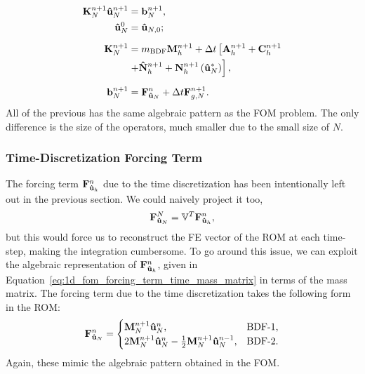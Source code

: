 \documentclass[../../thesis.tex]{subfiles}
\newcommand{\rbV}{\ensuremath{\mathbb{V}}}
\newcommand{\rbVT}{\ensuremath{\rbV^T}}
\newcommand{\dt}{\ensuremath{\Delta t}}
\newcommand{\Ah}[1]{\ensuremath{\vb{#1}^{n+1}_h}}
\begin{document}
\begin{subequations}
    \label{eq:1d_rom_linear_system_timestep}
    \begin{align}
        \vb{K}_{N}^{n+1} \vb{\hat{u}}_{N}^{n+1} &= \vb{b}_{N}^{n+1}, 
        \\
        \vb{\hat{u}}_{N}^{0} &= \vb{\hat{u}}_{N,0};
        \\[2mm]
        \vb{K}_{N}^{n+1} &= m_{\text{BDF}} \Ah{M} + \dt \left[\Ah{A} + \Ah{C} \right. 
        \nonumber 
        \\
                        &\left. + \Ah{\hat{N}} + \Ah{N}\left(\vb{\hat{u}}_{N}^{*}\right)\right],
        \\[2mm]
        \vb{b}_{N}^{n+1} &= \vb{F}_{\vb{\hat{u}}_{N}}^{n} + \dt \vb{F}_{g,N}^{n+1}.
    \end{align}
\end{subequations}
All of the previous has the same algebraic pattern as the FOM problem.
The only difference is the size of the operators, much smaller due to the small size of $N$. 

\subsubsection*{Time-Discretization Forcing Term}
The forcing term $\vb{F}_{\vb{\hat{u}}_h}^{n}$ due to the time discretization has been intentionally left out in the previous section.
We could naively project it too, 
\begin{equation}
    \vb{F}_{\vb{\hat{u}}_N}^{N} = \rbVT \vb{F}_{\vb{\hat{u}}_h}^{n},
\end{equation}
but this would force us to reconstruct the FE vector of the ROM at each time-step, making the integration cumbersome.
To go around this issue, we can exploit the algebraic representation of $\vb{F}_{\vb{\hat{u}}_h}^{n}$, 
given in Equation~\eqref{eq:1d_fom_forcing_term_time_mass_matrix} in terms of the mass matrix. 
The forcing term due to the time discretization takes the following form in the ROM:
\begin{equation}
    \vb{F}_{\vb{\hat{u}}_N}^{n} = 
    \begin{cases}
        \vb{M}_{N}^{n+1} \vb{\hat{u}}_{N}^{n},                & \text{BDF-1},
        \\
        2 \vb{M}_{N}^{n+1} \vb{\hat{u}}_{N}^{n}
        - \frac{1}{2}\vb{M}_{N}^{n+1} \vb{\hat{u}}_{N}^{n-1}, & \text{BDF-2}.
    \end{cases}
\end{equation}
Again, these mimic the algebraic pattern obtained in the FOM.
\end{document}
